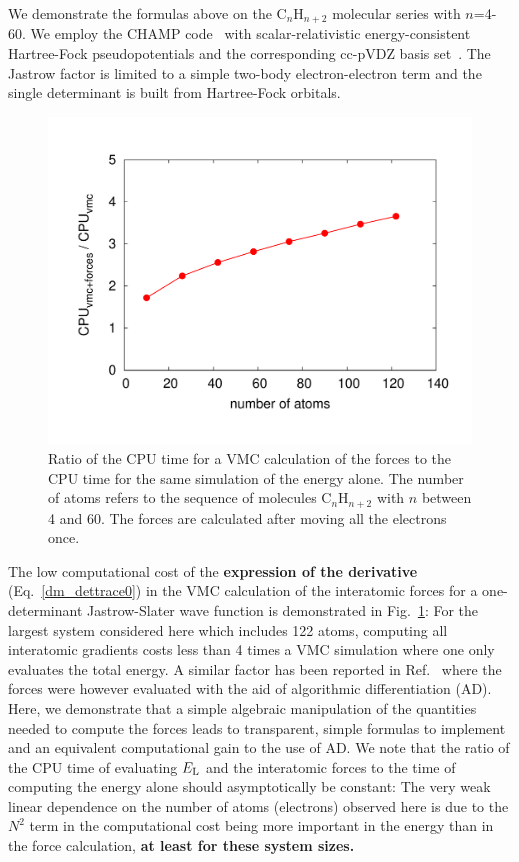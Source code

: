 \documentclass[aip,jcp,reprint,floatfix,onecolumn]{revtex4-1}
\begin{document}
We demonstrate the formulas above on the C$_n$H$_{n+2}$ molecular series with $n$=4-60. We employ the CHAMP code~\cite{Champ} with
scalar-relativistic energy-consistent Hartree-Fock pseudopotentials and the corresponding cc-pVDZ basis set~\cite{Burkatzki07,Hpseudo}.
The Jastrow factor is limited to a simple two-body electron-electron term and the single determinant is built from Hartree-Fock
orbitals.

\begin{figure}[h]
\includegraphics[width=\columnwidth]{afor.pdf}
\caption{
Ratio of the CPU time for a VMC calculation of the forces to the CPU time for the same
simulation of the energy alone. The number of atoms refers to the sequence of molecules C$_n$H$_{n+2}$ with $n$ between 4
and 60. The forces are calculated after moving all the electrons once.
}
\label{forces_a}
\end{figure}

The low computational cost of the %
{\bf expression of the derivative} (Eq.~\ref{dm_dettrace0}) in the VMC calculation of the
interatomic forces for a one-determinant Jastrow-Slater wave function is demonstrated in Fig.~\ref{forces_a}:
For the largest system considered here which includes 122 atoms, computing all interatomic gradients costs less
than 4 times a VMC simulation where one only evaluates the total energy.
A similar factor has been reported in Ref.~ where the forces were however evaluated with the aid of
algorithmic differentiation (AD). Here, we demonstrate that a simple algebraic manipulation of the quantities needed to
compute the forces leads to transparent, simple formulas to implement and an equivalent computational gain to the use of AD.
We note that the ratio of the CPU time of evaluating $E_{\rm L}$ and the interatomic forces to the time of computing
the energy alone should asymptotically be constant: The very weak linear dependence on the number of atoms (electrons)
observed here is due to the $N^2$ term in the computational cost being more important in the energy than in the force calculation,
{\bf at least for these system sizes.}
\end{document}
